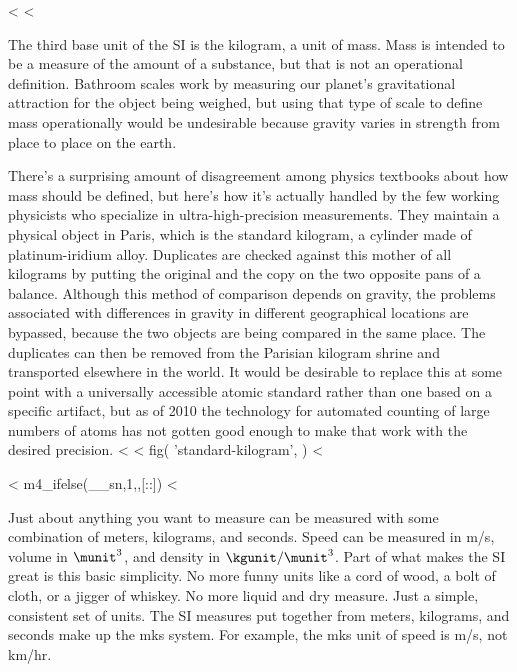 <%
<%

The third base unit of the SI is the kilogram,
a unit of mass.  Mass is intended to be a measure of the
amount of a substance, but that is not an operational
definition. Bathroom scales work by measuring our planet's
gravitational attraction for the object being weighed, but
using that type of scale to define mass operationally would
be undesirable because gravity varies in strength from place
to place on the earth.

There's a surprising amount of disagreement among physics
textbooks about how mass should be defined, but here's how
it's actually handled by the few working physicists who
specialize in ultra-high-precision measurements. They
maintain a physical object in Paris, which is the standard
kilogram, a cylinder made of platinum-iridium alloy.
Duplicates are checked against this mother of all kilograms
by putting the original and the copy on the two opposite
pans of a balance. Although this method of comparison
depends on gravity, the problems associated with differences
in gravity in different geographical locations are bypassed,
because the two objects are being compared in the same
place. The duplicates can then be removed from the Parisian
kilogram shrine and transported elsewhere in the world.
It would be desirable to replace this at some point with a
universally accessible atomic standard rather than one based on
a specific artifact, but as of 2010 the technology for automated counting
of large numbers of atoms has not gotten good
enough to make that work with the desired precision.
<%
<%
  fig(
    'standard-kilogram',
  )
<%

<%
m4_ifelse(__sn,1,,[:\vfill:])
<%

Just about anything you want to measure can be measured with
some combination of meters, kilograms, and seconds.  Speed
can be measured in m/s, volume in $\munit^3$, and density in
$\kgunit/\munit^3$. Part of what makes the SI great is this basic
simplicity. No more funny units like a cord of wood, a bolt
of cloth, or a jigger of whiskey. No more liquid and dry
measure. Just a simple, consistent set of units. The SI
measures put together from meters, kilograms, and seconds
make up the mks system. For example, the mks unit of
speed is m/s, not km/hr.

